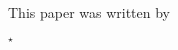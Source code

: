 \documentclass{article}
\begin{document}
This paper was written by 

$^\star$\explanationtext
\end{document}
